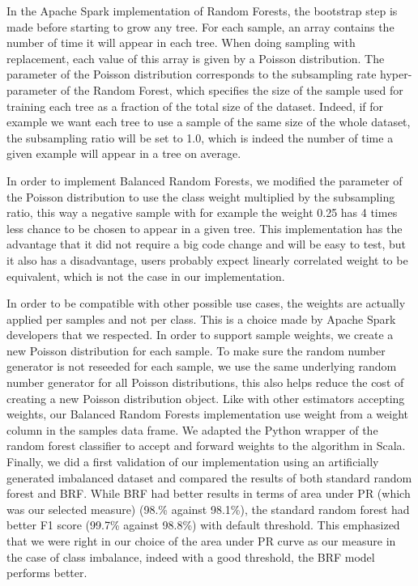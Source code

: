 \documentclass[conference]{IEEEtran}
\begin{document}
In the Apache Spark implementation of Random Forests, the bootstrap step is made before starting to grow any tree.
For each sample, an array contains the number of time it will appear in each tree.
When doing sampling with replacement, each value of this array is given by a Poisson distribution.
The parameter of the Poisson distribution corresponds to the subsampling rate hyper-parameter of the Random Forest, which specifies the size of the sample used for training each tree as a fraction of the total size of the dataset.
Indeed, if for example we want each tree to use a sample of the same size of the whole dataset, the subsampling ratio will be set to 1.0, which is indeed the number of time a given example will appear in a tree on average.

In order to implement Balanced Random Forests, we modified the parameter of the Poisson distribution to use the class weight multiplied by the subsampling ratio, this way a negative sample with for example the weight 0.25 has 4 times less chance to be chosen to appear in a given tree.
This implementation has the advantage that it did not require a big code change and will be easy to test, but it also has a disadvantage, users probably expect linearly correlated weight to be equivalent, which is not the case in our implementation.
	
In order to be compatible with other possible use cases, the weights are actually applied per samples and not per class.
This is a choice made by Apache Spark developers that we respected.
In order to support sample weights, we create a new Poisson distribution for each sample.
To make sure the random number generator is not reseeded for each sample, we use the same underlying random number generator for all Poisson distributions, this also helps reduce the cost of creating a new Poisson distribution object.
Like with other estimators accepting weights, our Balanced Random Forests implementation use weight from a weight column in the samples data frame.
We adapted the Python wrapper of the random forest classifier to accept and forward weights to the algorithm in Scala.
Finally, we did a first validation of our implementation using an artificially generated imbalanced dataset and compared the results of both standard random forest and BRF.
While BRF had better results in terms of area under PR (which was our selected measure) (98.\% against 98.1\%), the standard random forest had better F1 score (99.7\% against 98.8\%) with default threshold.
This emphasized that we were right in our choice of the area under PR curve as our measure in the case of class imbalance, indeed with a good threshold, the BRF model performs better.
\end{document}
